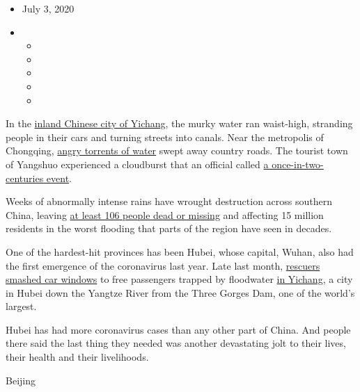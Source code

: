 \begin{itemize}
\item
  July 3, 2020
\item
  \begin{itemize}
  \item
  \item
  \item
  \item
  \item
  \end{itemize}
\end{itemize}

In the
\href{https://mp.weixin.qq.com/s?__biz=MjM5ODg0NzYwMQ==\&mid=2650458989\&idx=1\&sn=cb10b9cee1cfeeee29c3bcbce59af0d7\&chksm=beca1e7389bd976536caa0a37a8c6a3dc3f4163d5075370743b94f45e2b28f711de9b9226f00\&scene=4\#wechat_redirect}{inland
Chinese city of Yichang}, the murky water ran waist-high, stranding
people in their cars and turning streets into canals. Near the
metropolis of Chongqing,
\href{https://mp.weixin.qq.com/s/dYW1K1N6nqmvzLmCAeQiLQ}{angry torrents
of water} swept away country roads. The tourist town of Yangshuo
experienced a cloudburst that an official called
\href{https://www.infzm.com/contents/186093}{a once-in-two-centuries
event}.

Weeks of abnormally intense rains have wrought destruction across
southern China, leaving
\href{https://tv.cctv.com/2020/07/02/VIDEsn6CmjhENykQ0vaWO6vo200702.shtml}{at
least 106 people dead or missing} and affecting 15 million residents in
the worst flooding that parts of the region have seen in decades.

One of the hardest-hit provinces has been Hubei, whose capital, Wuhan,
also had the first emergence of the coronavirus last year. Late last
month,
\href{https://www.weibo.com/1205338040/J8zLu9vIZ?refer_flag=1001030103_\&type=comment}{rescuers
smashed car windows} to free passengers trapped by floodwater
\href{https://mp.weixin.qq.com/s?__biz=MjM5ODg0NzYwMQ==\&mid=2650458989\&idx=1\&sn=cb10b9cee1cfeeee29c3bcbce59af0d7\&chksm=beca1e7389bd976536caa0a37a8c6a3dc3f4163d5075370743b94f45e2b28f711de9b9226f00\&scene=4\#wechat_redirect}{in
Yichang}, a city in Hubei down the Yangtze River from the Three Gorges
Dam, one of the world's largest.

Hubei has had more coronavirus cases than any other part of China. And
people there said the last thing they needed was another devastating
jolt to their lives, their health and their livelihoods.

Beijing

